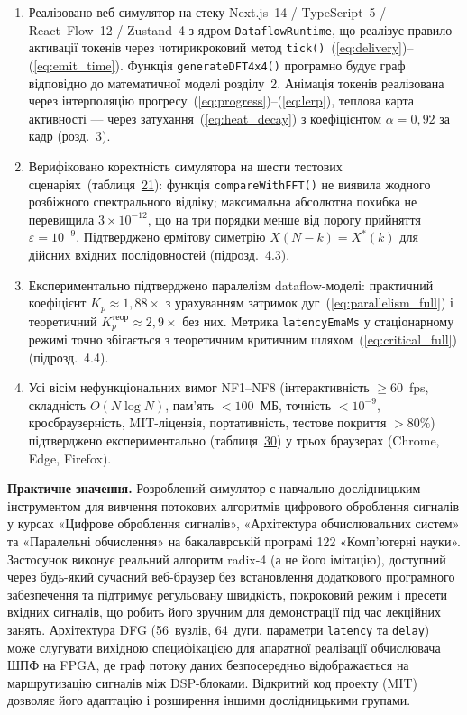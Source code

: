 \begin{enumerate}
\item
  Реалізовано веб-симулятор на стеку Next.js~14 / TypeScript~5 /
  React~Flow~12 / Zustand~4 з ядром \texttt{DataflowRuntime}, що
  реалізує правило активації токенів через чотирикроковий метод
  \texttt{tick()}~(\hyperref[eq:delivery]{{[}eq:delivery{]}})--(\hyperref[eq:emit_time]{{[}eq:emit\_time{]}}).
  Функція \texttt{generateDFT4x4()} програмно будує граф відповідно до
  математичної моделі розділу~2. Анімація токенів реалізована через
  інтерполяцію
  прогресу~(\hyperref[eq:progress]{{[}eq:progress{]}})--(\hyperref[eq:lerp]{{[}eq:lerp{]}}),
  теплова карта активності --- через
  затухання~(\hyperref[eq:heat_decay]{{[}eq:heat\_decay{]}}) з
  коефіцієнтом \(\alpha = 0,92\) за кадр (розд.~3).
\item
  Верифіковано коректність симулятора на шести тестових
  сценаріях~(таблиця~\hyperref[tab:scenarios]{21}): функція
  \texttt{compareWithFFT()} не виявила жодного розбіжного спектрального
  відліку; максимальна абсолютна похибка не перевищила
  \(3 \times 10^{- 12}\), що на три порядки менше від порогу прийняття
  \(\varepsilon = 10^{- 9}\). Підтверджено ермітову симетрію
  \(X(N - k) = X^{*}(k)\) для дійсних вхідних послідовностей
  (підрозд.~4.3).
\item
  Експериментально підтверджено паралелізм dataflow-моделі: практичний
  коефіцієнт \(K_{p} \approx 1,88 \times\) з урахуванням затримок
  дуг~(\hyperref[eq:parallelism_full]{{[}eq:parallelism\_full{]}}) і
  теоретичний \(K_{p}^{\text{теор}} \approx 2,9 \times\) без них.
  Метрика \texttt{latencyEmaMs} у стаціонарному режимі точно збігається
  з теоретичним критичним
  шляхом~(\hyperref[eq:critical_full]{{[}eq:critical\_full{]}})
  (підрозд.~4.4).
\item
  Усі вісім нефункціональних вимог NF1--NF8 (інтерактивність
  \(\geq 60\)~fps, складність \(O(N\log N)\), пам'ять \(< 100\)~МБ,
  точність \(< 10^{- 9}\), кросбраузерність, MIT-ліцензія,
  портативність, тестове покриття \(> 80\%\)) підтверджено
  експериментально (таблиця~\hyperref[tab:nf_verify]{30}) у трьох
  браузерах (Chrome, Edge, Firefox).
\end{enumerate}

\textbf{Практичне значення.} Розроблений симулятор є
навчально-дослідницьким інструментом для вивчення потокових алгоритмів
цифрового оброблення сигналів у курсах «Цифрове оброблення сигналів»,
«Архітектура обчислювальних систем» та «Паралельні обчислення» на
бакалаврській програмі 122 «Комп'ютерні науки». Застосунок виконує
реальний алгоритм radix-4 (а не його імітацію), доступний через
будь-який сучасний веб-браузер без встановлення додаткового програмного
забезпечення та підтримує регульовану швидкість, покроковий режим і
пресети вхідних сигналів, що робить його зручним для демонстрації під
час лекційних занять. Архітектура DFG (56~вузлів, 64~дуги, параметри
\texttt{latency} та \texttt{delay}) може слугувати вихідною
специфікацією для апаратної реалізації обчислювача ШПФ на FPGA, де граф
потоку даних безпосередньо відображається на маршрутизацію сигналів між
DSP-блоками. Відкритий код проекту (MIT) дозволяє його адаптацію і
розширення іншими дослідницькими групами.

